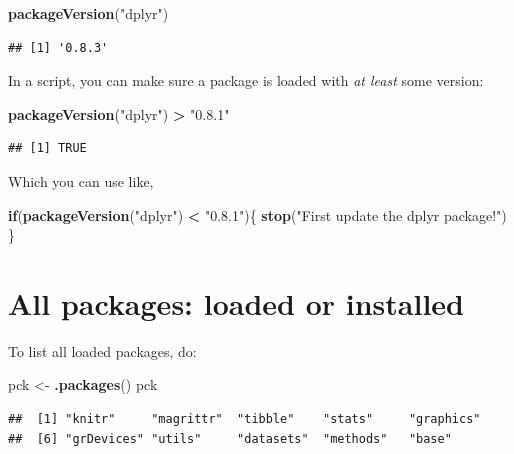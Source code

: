 \documentclass[]{book}
\newenvironment{Shaded}{\begin{snugshade}}{\end{snugshade}}
\newcommand{\ControlFlowTok}[1]{\textcolor[rgb]{0.13,0.29,0.53}{\textbf{#1}}}
\newcommand{\KeywordTok}[1]{\textcolor[rgb]{0.13,0.29,0.53}{\textbf{#1}}}
\newcommand{\NormalTok}[1]{#1}
\newcommand{\OperatorTok}[1]{\textcolor[rgb]{0.81,0.36,0.00}{\textbf{#1}}}
\newcommand{\StringTok}[1]{\textcolor[rgb]{0.31,0.60,0.02}{#1}}
\begin{document}
\begin{Shaded}
\begin{Highlighting}[]
\KeywordTok{packageVersion}\NormalTok{(}\StringTok{"dplyr"}\NormalTok{)}
\end{Highlighting}
\end{Shaded}

\begin{verbatim}
## [1] '0.8.3'
\end{verbatim}

In a script, you can make sure a package is loaded with \emph{at least} some version:

\begin{Shaded}
\begin{Highlighting}[]
\KeywordTok{packageVersion}\NormalTok{(}\StringTok{"dplyr"}\NormalTok{) }\OperatorTok{>}\StringTok{ "0.8.1"}
\end{Highlighting}
\end{Shaded}

\begin{verbatim}
## [1] TRUE
\end{verbatim}

Which you can use like,

\begin{Shaded}
\begin{Highlighting}[]
\ControlFlowTok{if}\NormalTok{(}\KeywordTok{packageVersion}\NormalTok{(}\StringTok{"dplyr"}\NormalTok{) }\OperatorTok{<}\StringTok{ "0.8.1"}\NormalTok{)\{}
  \KeywordTok{stop}\NormalTok{(}\StringTok{"First update the dplyr package!"}\NormalTok{)}
\NormalTok{\}}
\end{Highlighting}
\end{Shaded}

\hypertarget{all-packages-loaded-or-installed}{%
\section{All packages: loaded or installed}\label{all-packages-loaded-or-installed}}

To list all loaded packages, do:

\begin{Shaded}
\begin{Highlighting}[]
\NormalTok{pck <-}\StringTok{ }\KeywordTok{.packages}\NormalTok{()}
\NormalTok{pck}
\end{Highlighting}
\end{Shaded}

\begin{verbatim}
##  [1] "knitr"     "magrittr"  "tibble"    "stats"     "graphics" 
##  [6] "grDevices" "utils"     "datasets"  "methods"   "base"
\end{verbatim}
\end{document}
